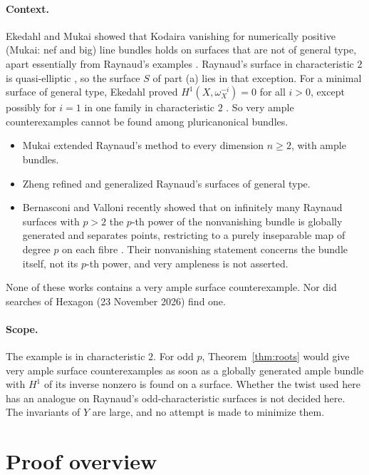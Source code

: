 \documentclass[11pt,a4paper]{article}
\theoremstyle{plain}
\theoremstyle{remark}
\begin{document}
\paragraph{Context.} Ekedahl and Mukai showed that Kodaira vanishing for numerically positive (Mukai: nef and big)
line bundles holds on surfaces that are not of general type, apart essentially from Raynaud's examples
\cite[p.~99 and Theorem~II.1.3]{Ekedahl}\cite[Theorem~3]{Mukai}. Raynaud's surface in characteristic $2$ is
quasi-elliptic \cite[Remarque~1, pp.~277--278]{Raynaud}, so the surface $S$ of part (a) lies in that exception. For a
minimal surface of general type, Ekedahl proved $H^1(X,\omega_X^{-i})=0$ for all $i>0$, except possibly for $i=1$ in
one family in characteristic $2$ \cite[Main theorem~(i), p.~97]{Ekedahl}. So very ample counterexamples cannot be
found among pluricanonical bundles.
\begin{itemize}
\item Mukai \cite[Theorem~2]{Mukai} extended Raynaud's method to every dimension $n\ge2$, with ample bundles.
\item Zheng \cite{Zheng} refined and generalized Raynaud's surfaces of general type.
\item Bernasconi and Valloni recently showed that on infinitely many Raynaud surfaces with $p>2$ the $p$-th power of
the nonvanishing bundle is globally generated and separates points, restricting to a purely inseparable map of degree
$p$ on each fibre \cite[Theorem~1.2 and Propositions~3.13--3.14]{BV}. Their nonvanishing statement concerns the
bundle itself, not its $p$-th power, and very ampleness is not asserted.
\end{itemize}
None of these works contains a very ample surface counterexample. Nor did searches of Hexagon (23 November 2026)
find one.

\paragraph{Scope.} The example is in characteristic $2$. For odd $p$, Theorem~\ref{thm:roots} would give very ample
surface counterexamples as soon as a globally generated ample bundle with $H^1$ of its inverse nonzero is found on a
surface. Whether the twist used here has an analogue on Raynaud's odd-characteristic surfaces is not decided here.
The invariants of $Y$ are large, and no attempt is made to minimize them.

\section{Proof overview}
\end{document}

